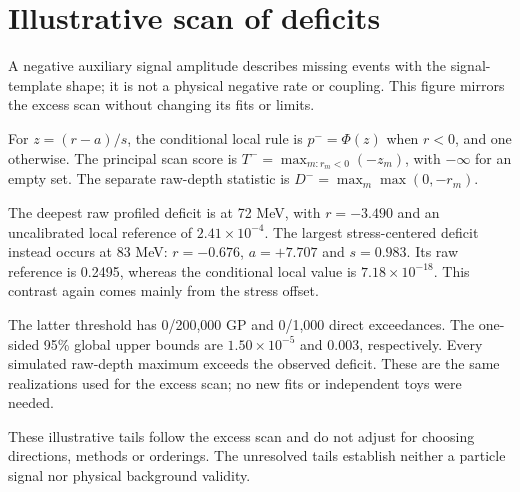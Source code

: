 \section{Illustrative scan of deficits}
A negative auxiliary signal amplitude describes missing events with the signal-template shape; it is not a physical negative rate or coupling. This figure mirrors the excess scan without changing its fits or limits.


For $z=(r-a)/s$, the conditional local rule is $p^-=\Phi(z)$ when $r<0$, and one otherwise. The principal scan score is $T^-=\max_{m:r_m<0}(-z_m)$, with $-\infty$ for an empty set. The separate raw-depth statistic is $D^-=\max_m\max(0,-r_m)$.

The deepest raw profiled deficit is at 72 MeV, with $r=-3.490$ and an uncalibrated local reference of $2.41\times10^{-4}$. The largest stress-centered deficit instead occurs at 83 MeV: $r=-0.676$, $a=+7.707$ and $s=0.983$. Its raw reference is 0.2495, whereas the conditional local value is $7.18\times10^{-18}$. This contrast again comes mainly from the stress offset.

The latter threshold has 0/200,000 GP and 0/1,000 direct exceedances. The one-sided 95\% global upper bounds are $1.50\times10^{-5}$ and 0.003, respectively. Every simulated raw-depth maximum exceeds the observed deficit. These are the same realizations used for the excess scan; no new fits or independent toys were needed.

These illustrative tails follow the excess scan and do not adjust for choosing directions, methods or orderings. The unresolved tails establish neither a particle signal nor physical background validity.
